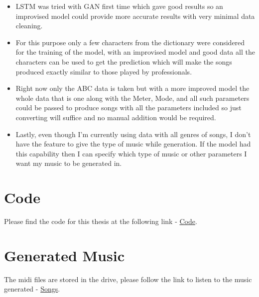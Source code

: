 \documentclass[oneside,12pt]{Classes/RoboticsLaTeX}
\begin{document}
\begin{itemize}
  \item LSTM was tried with GAN first time which gave good results so an improvised model could provide more accurate results with very minimal data cleaning.
\end{itemize}

\begin{itemize}
  \item For this purpose only a few characters from the dictionary were considered for the training of the model, with an improvised model and good data all the characters can be used to get the prediction which will make the songs produced exactly similar to those played by professionals.
\end{itemize}

\begin{itemize}
  \item Right now only the ABC data is taken but with a more improved model the whole data that is one along with the Meter, Mode, and all such parameters could be passed to produce songs with all the parameters included so just converting will suffice and no manual addition would be required.
\end{itemize}

\begin{itemize}
  \item Lastly, even though I'm currently using data with all genres of songs, I don't have the feature to give the type of music while generation. If the model had this capability then I can specify which type of music or other parameters I want my music to be generated in.
\end{itemize}
\renewcommand{\bibname}{References}           %


\appendix
\chapter{Code} 

Please find the code for this thesis at the following link - \href{https://github.com/tapanauti/MSC_Thesis/blob/main/Final_thesis.ipynb}{Code}.

\chapter{Generated Music} 

The midi files are stored in the drive, please follow the link to listen to the music generated - \href{https://drive.google.com/drive/folders/14EMRpjFe9Wrr2mMnjLbV1q08sLtNSFwh?usp=sharing}{Songs}.
\end{document}
